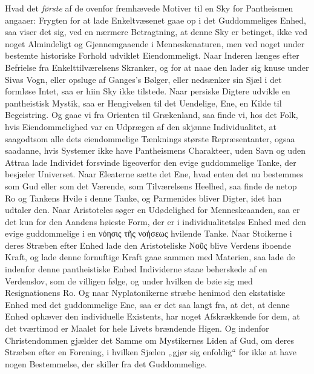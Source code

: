 Hvad det \emph{første} af de ovenfor fremhævede Motiver til en Sky for
Pantheismen angaaer: Frygten for at lade Enkeltvæsenet gaae op i det
Guddommeliges Enhed, saa viser det sig, ved en nærmere Betragtning, at denne
Sky er betinget, ikke ved noget Almindeligt og Gjennemgaaende i
Menneskenaturen, men ved noget under bestemte historiske Forhold udviklet
Eiendommeligt. Naar Inderen længes efter Befrielse fra Enkelttilværelsens
Skranker, og for at naae den lader sig knuse under Sivas Vogn, eller opsluge af
Ganges's Bølger, eller nedsænker sin Sjæl i det formløse Intet, saa er hiin Sky
ikke tilstede. Naar persiske Digtere udvikle en pantheistisk Mystik, saa er
Hengivelsen til det Uendelige, Ene, en Kilde til Begeistring. Og gaae vi fra
Orienten til Grækenland, saa finde vi, hos det Folk, hvis Eiendommelighed var
en Udprægen af den skjønne Individualitet, at saagodtsom alle dets
eiendommelige Tænknings største Repræsentanter, ogsaa saadanne, hvis Systemer
ikke have Pantheismens Charakteer, uden Savn og uden Attraa lade Individet
forsvinde ligeoverfor den evige guddommelige Tanke, der besjæler Universet.
Naar Eleaterne sætte det Ene, hvad enten det nu bestemmes som Gud eller som det
Værende, som Tilværelsens Heelhed, saa finde de netop Ro og Tankens Hvile i
denne Tanke, og Parmenides bliver Digter, idet han udtaler den. Naar
Aristoteles søger en Udødelighed for Menneskeaanden, saa er det kun for den
 Aandens høieste Form, der er i individualitetsløs Enhed med den evige
guddommelige i en νόησις τῆς νοήσεως hvilende Tanke. Naar Stoikerne i deres
Stræben efter Enhed lade den Aristoteliske Νοῦς blive Verdens iboende Kraft, og
lade denne fornuftige Kraft gaae sammen med Materien, saa lade de indenfor
denne pantheistiske Enhed Individerne staae beherskede af en Verdenslov, som de
villigen følge, og under hvilken de bøie sig med Resignationens Ro. Og naar
Nyplatonikerne stræbe henimod den ekstatiske Enhed med det guddommelige Ene,
saa er det saa langt fra, at det, at denne Enhed ophæver den individuelle
Existents, har noget Afskrækkende for dem, at det tværtimod er Maalet for hele
Livets brændende Higen. Og indenfor Christendommen gjælder det Samme om
Mystikernes Liden af Gud, om deres Stræben efter en Forening, i hvilken Sjælen
„gjør sig enfoldig“ for ikke at have nogen Bestemmelse, der skiller fra det
Guddommelige.

